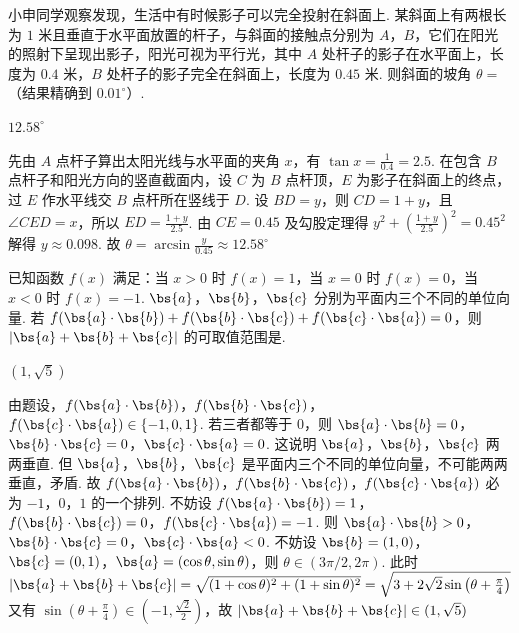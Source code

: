 \begin{problem}
小申同学观察发现，生活中有时候影子可以完全投射在斜面上. 某斜面上有两根长为 \(1\) 米且垂直于水平面放置的杆子，与斜面的接触点分别为 \(A\)，\(B\)，它们在阳光的照射下呈现出影子，阳光可视为平行光，其中 \(A\) 处杆子的影子在水平面上，长度为 \(0.4\) 米，\(B\) 处杆子的影子完全在斜面上，长度为 \(0.45\) 米. 则斜面的坡角 \(\theta=\)\fillinblank{}（结果精确到 \(0.01^\circ\)）.

\end{problem}

\begin{answer}
\(12.58^\circ\)
\end{answer}

\begin{solution}
先由 \(A\) 点杆子算出太阳光线与水平面的夹角 \(x\)，有 \(\tan x=\frac{1}{0.4}=2.5\).
在包含 \(B\) 点杆子和阳光方向的竖直截面内，设 \(C\) 为 \(B\) 点杆顶，\(E\) 为影子在斜面上的终点，过 \(E\) 作水平线交 \(B\) 点杆所在竖线于 \(D\). 设 \(BD=y\)，则 \(CD=1+y\)，且 \(\angle CED=x\)，所以 \(ED=\frac{1+y}{2.5}\).
由 \(CE=0.45\) 及勾股定理得
\(
y^2+\left(\frac{1+y}{2.5}\right)^2=0.45^2
\)
解得 \(y\approx0.098\).
故
\(
\theta=\arcsin\frac{y}{0.45}\approx12.58^\circ
\)
\end{solution}

\begin{problem}
已知函数 \(f(x)\) 满足：当 \(x>0\) 时 \(f(x)=1\)，当 \(x=0\) 时 \(f(x)=0\)，当 \(x<0\) 时 \(f(x)=-1\). \(\bs{a}\)，\(\bs{b}\)，\(\bs{c}\) 分别为平面内三个不同的单位向量. 若 \(f(\bs{a}\cdot\bs{b})+f(\bs{b}\cdot\bs{c})+f(\bs{c}\cdot\bs{a})=0\)，则 \(|\bs{a}+\bs{b}+\bs{c}|\) 的可取值范围是\fillinblank{}.
\end{problem}

\begin{answer}
\((1,\sqrt5)\)
\end{answer}

\begin{solution}
由题设，\(f(\bs{a}\cdot\bs{b})\)，\(f(\bs{b}\cdot\bs{c})\)，\(f(\bs{c}\cdot\bs{a})\in\{-1,0,1\}\). 若三者都等于 \(0\)，则
\(\bs{a}\cdot\bs{b}=0\)，\(\bs{b}\cdot\bs{c}=0\)，\(\bs{c}\cdot\bs{a}=0\).
这说明 \(\bs{a}\)，\(\bs{b}\)，\(\bs{c}\) 两两垂直. 但 \(\bs{a}\)，\(\bs{b}\)，\(\bs{c}\) 是平面内三个不同的单位向量，不可能两两垂直，矛盾.
故 \(f(\bs{a}\cdot\bs{b})\)，\(f(\bs{b}\cdot\bs{c})\)，\(f(\bs{c}\cdot\bs{a})\) 必为 \(-1\)，\(0\)，\(1\) 的一个排列. 不妨设
\(f(\bs{a}\cdot\bs{b})=1\)，\(f(\bs{b}\cdot\bs{c})=0\)，\(f(\bs{c}\cdot\bs{a})=-1\).
则
\(\bs{a}\cdot\bs{b}>0\)，\(\bs{b}\cdot\bs{c}=0\)，\(\bs{c}\cdot\bs{a}<0\).
不妨设 \(\bs{b}=(1,0)\)，\(\bs{c}=(0,1)\)，\(\bs{a}=(\cos\theta,\sin\theta)\)，则 \(\theta\in(3\pi/2,2\pi)\). 此时
\(
|\bs{a}+\bs{b}+\bs{c}|=\sqrt{(1+\cos\theta)^2+(1+\sin\theta)^2}=\sqrt{3+2\sqrt2\sin\left(\theta+\frac{\pi}{4}\right)}
\)
又有 \(\sin\left(\theta+\frac{\pi}{4}\right)\in\left(-1,\frac{\sqrt2}{2}\right)\)，故
\(
|\bs{a}+\bs{b}+\bs{c}|\in(1,\sqrt5)
\)
\end{solution}

